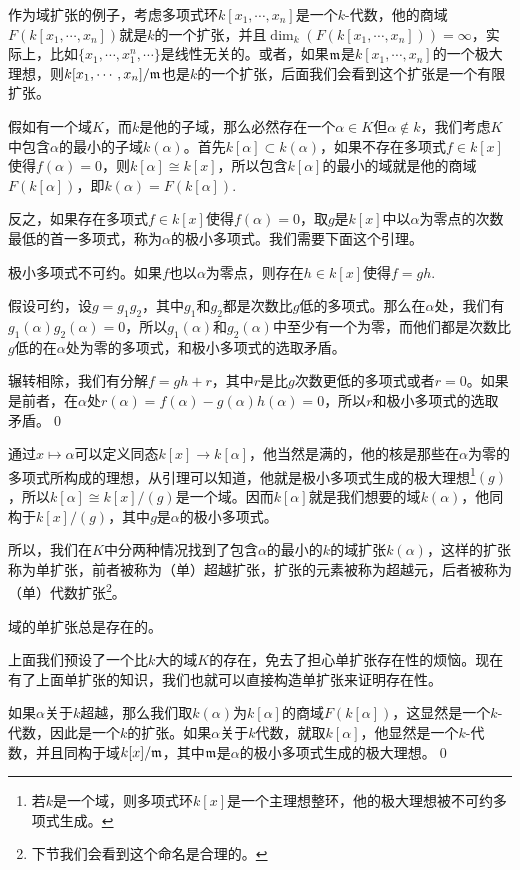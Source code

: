 作为域扩张的例子，考虑多项式环$k[x_1,\cdots,x_n]$是一个$k$-代数，他的商域$F(k[x_1,\cdots,x_n])$就是$k$的一个扩张，并且$\dim_k(F(k[x_1,\cdots,x_n]))=\infty$，实际上，比如$\{x_1,\cdots,x_1^n,\cdots\}$是线性无关的。或者，如果$\mathfrak{m}$是$k[x_1,\cdots,x_n]$的一个极大理想，则$k[x_1,\cdots,x_n]/\mathfrak{m}$也是$k$的一个扩张，后面我们会看到这个扩张是一个有限扩张。

假如有一个域$K$，而$k$是他的子域，那么必然存在一个$\alpha\in K$但$\alpha\notin k$，我们考虑$K$中包含$\alpha$的最小的子域$k(\alpha)$。首先$k[\alpha]\subset k(\alpha)$，如果不存在多项式$f\in k[x]$使得$f(\alpha)=0$，则$k[\alpha]\cong k[x]$，所以包含$k[\alpha]$的最小的域就是他的商域$F(k[\alpha])$，即$k(\alpha)=F(k[\alpha])$.

反之，如果存在多项式$f\in k[x]$使得$f(\alpha)=0$，取$g$是$k[x]$中以$\alpha$为零点的次数最低的首一多项式，称为$\alpha$的极小多项式。我们需要下面这个引理。

极小多项式不可约。如果$f$也以$\alpha$为零点，则存在$h\in k[x]$使得$f=gh$.

\proof 假设可约，设$g=g_1g_2$，其中$g_1$和$g_2$都是次数比$g$低的多项式。那么在$\alpha$处，我们有$g_1(\alpha)g_2(\alpha)=0$，所以$g_1(\alpha)$和$g_2(\alpha)$中至少有一个为零，而他们都是次数比$g$低的在$\alpha$处为零的多项式，和极小多项式的选取矛盾。

	辗转相除，我们有分解$f=gh+r$，其中$r$是比$g$次数更低的多项式或者$r=0$。如果是前者，在$\alpha$处$r(\alpha)=f(\alpha)-g(\alpha)h(\alpha)=0$，所以$r$和极小多项式的选取矛盾。\qed

通过$x\mapsto \alpha$可以定义同态$k[x]\to k[\alpha]$，他当然是满的，他的核是那些在$\alpha$为零的多项式所构成的理想，从引理可以知道，他就是极小多项式生成的极大理想\footnote{若$k$是一个域，则多项式环$k[x]$是一个主理想整环，他的极大理想被不可约多项式生成。}$(g)$，所以$k[\alpha]\cong k[x]/(g)$是一个域。因而$k[\alpha]$就是我们想要的域$k(\alpha)$，他同构于$k[x]/(g)$，其中$g$是$\alpha$的极小多项式。

所以，我们在$K$中分两种情况找到了包含$\alpha$的最小的$k$的域扩张$k(\alpha)$，这样的扩张称为单扩张，前者被称为（单）超越扩张，扩张的元素被称为超越元，后者被称为（单）代数扩张\footnote{下节我们会看到这个命名是合理的。}。

\pro 域的单扩张总是存在的。

\proof 上面我们预设了一个比$k$大的域$K$的存在，免去了担心单扩张存在性的烦恼。现在有了上面单扩张的知识，我们也就可以直接构造单扩张来证明存在性。

	如果$\alpha$关于$k$超越，那么我们取$k(\alpha)$为$k[\alpha]$的商域$F(k[\alpha])$，这显然是一个$k$-代数，因此是一个$k$的扩张。如果$\alpha$关于$k$代数，就取$k[\alpha]$，他显然是一个$k$-代数，并且同构于域$k[x]/\mathfrak{m}$，其中$\mathfrak{m}$是$\alpha$的极小多项式生成的极大理想。\qed

